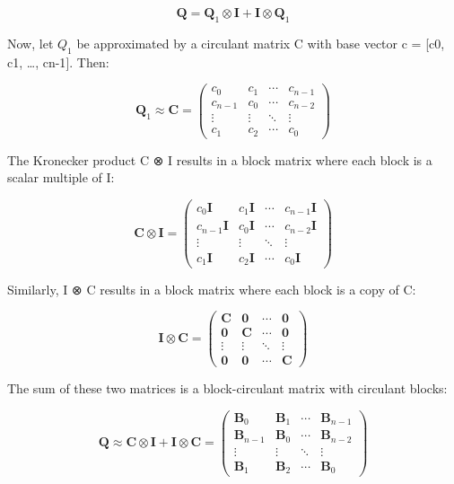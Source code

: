 \documentclass[journal=,manuscript=]{achemso}
\begin{document}
\[
\mathbf{Q} = \mathbf{Q}_1 \otimes \mathbf{I} + \mathbf{I} \otimes \mathbf{Q}_1
\]

Now, let \(Q_1\) be approximated by a circulant matrix C with base
vector c = {[}c0, c1, \ldots, cn-1{]}. Then:

\[
\mathbf{Q}_1 \approx \mathbf{C} = 
\begin{pmatrix}
c_0 & c_1 & \cdots & c_{n-1} \\
c_{n-1} & c_0 & \cdots & c_{n-2} \\
\vdots & \vdots & \ddots & \vdots \\
c_1 & c_2 & \cdots & c_0
\end{pmatrix}
\]

The Kronecker product C ⊗ I results in a block matrix where each block
is a scalar multiple of I:

\[
\mathbf{C} \otimes \mathbf{I} = 
\begin{pmatrix}
c_0\mathbf{I} & c_1\mathbf{I} & \cdots & c_{n-1}\mathbf{I} \\
c_{n-1}\mathbf{I} & c_0\mathbf{I} & \cdots & c_{n-2}\mathbf{I} \\
\vdots & \vdots & \ddots & \vdots \\
c_1\mathbf{I} & c_2\mathbf{I} & \cdots & c_0\mathbf{I}
\end{pmatrix}
\]

Similarly, I ⊗ C results in a block matrix where each block is a copy of
C:

\[
\mathbf{I} \otimes \mathbf{C} = 
\begin{pmatrix}
\mathbf{C} & \mathbf{0} & \cdots & \mathbf{0} \\
\mathbf{0} & \mathbf{C} & \cdots & \mathbf{0} \\
\vdots & \vdots & \ddots & \vdots \\
\mathbf{0} & \mathbf{0} & \cdots & \mathbf{C}
\end{pmatrix}
\]

The sum of these two matrices is a block-circulant matrix with circulant
blocks:

\[
\mathbf{Q} \approx \mathbf{C} \otimes \mathbf{I} + \mathbf{I} \otimes \mathbf{C} = 
\begin{pmatrix}
\mathbf{B}_0 & \mathbf{B}_1 & \cdots & \mathbf{B}_{n-1} \\
\mathbf{B}_{n-1} & \mathbf{B}_0 & \cdots & \mathbf{B}_{n-2} \\
\vdots & \vdots & \ddots & \vdots \\
\mathbf{B}_1 & \mathbf{B}_2 & \cdots & \mathbf{B}_0
\end{pmatrix}
\]
\end{document}
